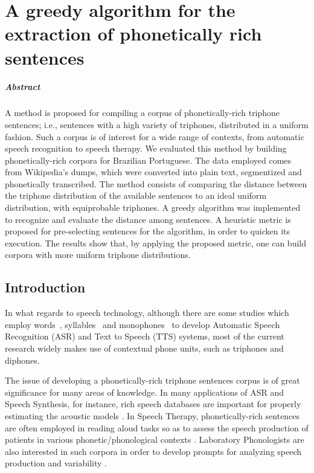 \chapter{A greedy algorithm for the extraction of phonetically rich sentences}\label{ch:phonetically-rich}

\paragraph{Abstract}
A method is proposed for compiling a corpus of phonetically-rich triphone sentences; 
i.e., sentences with a high variety of triphones, distributed in a uniform fashion. 
Such a corpus is of interest for a wide range of contexts, from automatic speech 
recognition to speech therapy. We evaluated this method by building phonetically-rich corpora for Brazilian Portuguese. The data employed comes 
from Wikipedia's dumps, which were converted into plain text, segmentized and 
phonetically transcribed. The method consists of comparing the distance between 
the triphone distribution of the available sentences to an ideal uniform distribution, with 
equiprobable triphones. A greedy algorithm was implemented to recognize and evaluate 
the distance among sentences. A heuristic metric is proposed for pre-selecting 
sentences for the algorithm, in order to quicken its execution. The results show 
that, by applying the proposed metric, one can build corpora with more uniform 
triphone distributions.


\section{Introduction}

In what regards to speech technology, although there are some studies which employ words~\cite{Thanga2008}, syllables~\cite{Gana2001} and monophones~\cite{Kumar2014} to develop Automatic Speech Recognition (ASR) and Text to Speech (TTS) systems, most of the current research widely makes use of contextual phone units, such as triphones and diphones.

The issue of developing a phonetically-rich triphone sentences corpus is of great significance for many areas 
of knowledge. In many applications of  ASR and Speech Synthesis, for instance, rich speech databases are important for properly estimating the acoustic models \cite{Rabiner2007}. In Speech Therapy, phonetically-rich sentences are often employed in reading aloud tasks so as to assess the speech production of patients in various phonetic/phonological contexts \cite{Mendes2012}. Laboratory Phonologists
are also interested in such corpora in order to develop prompts for analyzing speech production and variability \cite{Pierrehumbert2000}.

